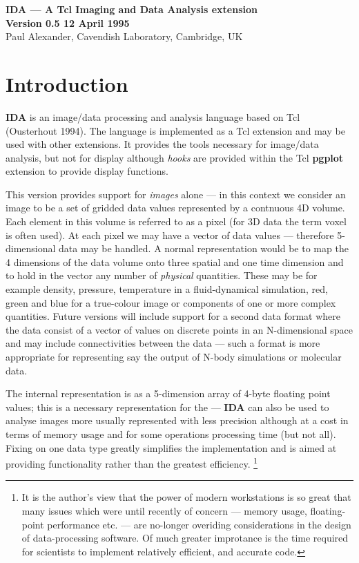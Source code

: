 


\begin{center}
{\large \bf IDA --- A Tcl Imaging and Data Analysis extension} \\
\vspace{0.5cm}
{\large \bf Version 0.5 12 April 1995} \\
\vspace{0.5cm}
{\large Paul Alexander, Cavendish Laboratory, Cambridge, UK}\\
\end{center}

\section{Introduction}

{\bf IDA} is an image/data processing and analysis language based
on Tcl (Ousterhout 1994).  The language is implemented as a Tcl
extension and may be used with other extensions.  It provides the
tools necessary for image/data analysis, but not for display although
{\it hooks} are provided within the Tcl {\bf pgplot} extension to provide
display functions.  

This version provides support for {\em images} alone ---
in this context we consider an image to be a set of gridded data values
represented by a contnuous 4D volume.  Each element in this volume is referred
to as a pixel (for 3D data the term voxel is often used).  At each pixel
we may have a vector of data values --- therefore 5-dimensional data
may be handled.  A normal representation would be to map the 4 dimensions
of the data volume onto three spatial and one time dimension and to hold in
the vector any number of {\em physical} quantities.  These may be for example
density, pressure, temperature in a fluid-dynamical simulation, red, green
and blue for a true-colour image or components of one or more complex
quantities.  Future versions will include support for a second data format
where the data consist of a vector of values on discrete points in an
N-dimensional space and may include connectivities between the data ---
such a format is more appropriate for representing say the output of N-body
simulations or molecular data.

The internal representation is as a 5-dimension array of
4-byte floating point values; this is a necessary representation for the ---
{\bf IDA} can also be used to analyse images more usually
represented with less precision although at a cost in terms of memory usage
and for some operations processing time (but not all).
Fixing on one data type greatly simplifies
the implementation and is aimed at providing functionality rather than
the greatest efficiency.
\footnote{
It is the author's view that the power of
modern workstations is so great that many issues which were until
recently of concern --- memory usage, floating-point performance etc. --- 
are no-longer overiding considerations in the design of 
data-processing software.  Of much greater improtance is the time required
for scientists to implement relatively efficient, and accurate code.
}

